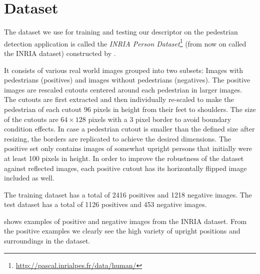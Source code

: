 \documentclass[thesis.tex]{subfiles}
\begin{document}
\section{Dataset}
\label{sec:odDataset}

The dataset we use for training and testing our descriptor on the pedestrian detection application is called the \emph{INRIA Person Dataset}\footnote{\url{http://pascal.inrialpes.fr/data/human/}} (from now on called the INRIA dataset) constructed by \citet{dalal2005histograms}.

It consists of various real world images grouped into two subsets: Images with pedestrians (positives) and images without pedestrians (negatives). The positive images are rescaled cutouts centered around each pedestrian in larger images. The cutouts are first extracted and then individually re-scaled to make the pedestrian of each cutout 96 pixels in height from their feet to shoulders. The size of the cutouts are $64 \times 128$ pixels with a 3 pixel border to avoid boundary condition effects. In case a pedestrian cutout is smaller than the defined size after resizing, the borders are replicated to achieve the desired dimensions.
The positive set only contains images of somewhat upright persons that initially were at least 100 pixels in height. In order to improve the robustness of the dataset against reflected images, each positive cutout has its horizontally flipped image included as well.

The training dataset has a total of 2416 positives and 1218 negative images.
The test dataset has a total of 1126 positives and 453 negative images.

 shows examples of positive  and negative  images from the INRIA dataset. From the positive examples we clearly see the high variety of upright positions and surroundings in the dataset.
\end{document}
